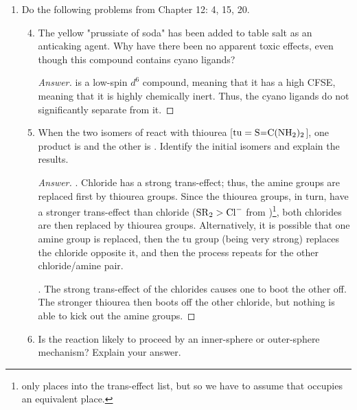 \documentclass[../psets.tex]{subfiles}
\begin{document}
\begin{enumerate}[label={\Roman*)}]
\begin{enumerate}
\begin{proof}[Answer]
        \end{proof}
    \end{enumerate}
    \newpage
    \item Do the following problems from Chapter 12: 4, 15, 20.
    \begin{enumerate}[label={\textbf{12.\arabic*}}]
        \setcounter{enumii}{3}
        \item The yellow "prussiate of soda"  has been added to table salt as an anticaking agent. Why have there been no apparent toxic effects, even though this compound contains cyano ligands?
        \begin{proof}[Answer]
             is a low-spin $d^6$ compound, meaning that it has a high CFSE, meaning that it is highly chemically inert. Thus, the cyano ligands do not significantly separate from it.
        \end{proof}
        \newpage
        \setcounter{enumii}{14}
        \item When the two isomers of  react with thiourea [$\text{tu}=\ce{S=C(NH2)2}$], one product is  and the other is . Identify the initial isomers and explain the results.
        \begin{proof}[Answer]
            . Chloride has a strong trans-effect; thus, the amine groups are replaced first by thiourea groups. Since the thiourea groups, in turn, have a stronger trans-effect than chloride ($\ce{SR2}>\ce{Cl-}$ from \cite[460]{bib:MiesslerFischerTarr})\footnote{\textcite{bib:MiesslerFischerTarr} only places  into the trans-effect list, but so we have to assume that  occupies an equivalent place.}, both chlorides are then replaced by thiourea groups. Alternatively, it is possible that one amine group is replaced, then the tu group (being very strong) replaces the chloride opposite it, and then the process repeats for the other chloride/amine pair.\par
            . The strong trans-effect of the chlorides causes one to boot the other off. The stronger thiourea then boots off the other chloride, but nothing is able to kick out the amine groups.
        \end{proof}
        \newpage
        \setcounter{enumii}{19}
        \item Is the reaction  likely to proceed by an inner-sphere or outer-sphere mechanism? Explain your answer.

\end{enumerate}
\end{enumerate}
\end{document}
